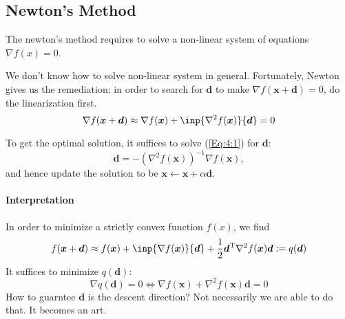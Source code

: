 \subsection{Newton's Method}

The newton's method requires to solve a non-linear system of equations $\nabla f(x)=0$.

We don't know how to solve non-linear system in general. Fortunately, Newton gives us the remediation: 
in order to search for $\bm d$ to make $\nabla f(\bm x+\bm d)=0$, do the linearization first.
\begin{equation}\label{Eq:4:1}
\nabla f(\bm x+\bm d)\approx \nabla f(\bm x)+\inp{\nabla^2 f(\bm x)}{\bm d}=0
\end{equation}

To get the optimal solution, it suffices to solve (\ref{Eq:4:1}) for $\bm d$:
\[
\bm d=-(\nabla^2 f(\bm x))^{-1}\nabla f(\bm x),
\]
and hence update the solution to be $\bm x\leftarrow \bm x+\alpha\bm d$.

\paragraph{Interpretation}
In order to minimize a strictly convex function $f(x)$, we find
\[
f(\bm x+\bm d) \approx f(\bm x)+\inp{\nabla f(\bm x)}{\bm d}+\frac{1}{2}\bm d\trans\nabla^2 f(\bm x)\bm d:=q(\bm d)
\]
It suffices to minimize $q(\bm d)$:
\[
\nabla q(\bm d)=0\Longleftrightarrow
\nabla f(\bm x)+\nabla^2f(\bm x)\bm d=0
\]
How to guarntee $\bm d$ is the descent direction? Not necessarily we are able to do that. It becomes an art.

